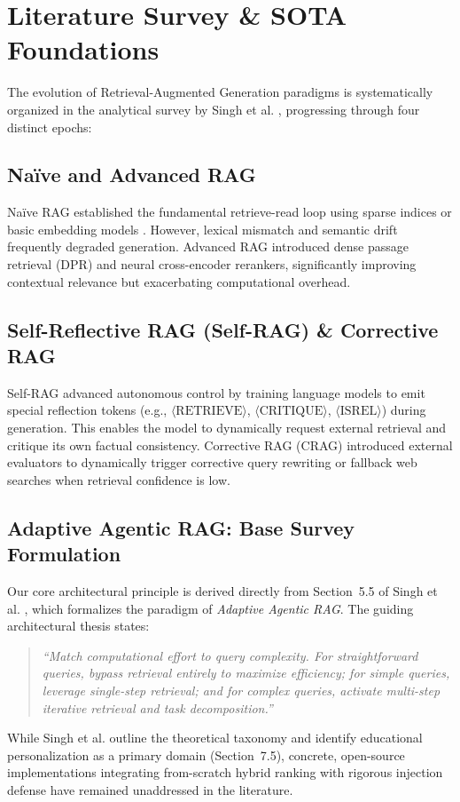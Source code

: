 \documentclass[conference]{IEEEtran}
\begin{document}
\section{Literature Survey \& SOTA Foundations}
The evolution of Retrieval-Augmented Generation paradigms is systematically organized in the analytical survey by Singh et al. \cite{singh2026agentic}, progressing through four distinct epochs:

\subsection{Na\"ive and Advanced RAG}
Na\"ive RAG established the fundamental retrieve-read loop using sparse indices or basic embedding models \cite{gao2024rag}. However, lexical mismatch and semantic drift frequently degraded generation. Advanced RAG introduced dense passage retrieval (DPR) \cite{karpukhin2020dpr} and neural cross-encoder rerankers, significantly improving contextual relevance but exacerbating computational overhead.

\subsection{Self-Reflective RAG (Self-RAG) \& Corrective RAG}
Self-RAG \cite{asai2024selfrag} advanced autonomous control by training language models to emit special reflection tokens (e.g., $\langle\text{RETRIEVE}\rangle$, $\langle\text{CRITIQUE}\rangle$, $\langle\text{ISREL}\rangle$) during generation. This enables the model to dynamically request external retrieval and critique its own factual consistency. Corrective RAG (CRAG) \cite{yan2024crag} introduced external evaluators to dynamically trigger corrective query rewriting or fallback web searches when retrieval confidence is low.

\subsection{Adaptive Agentic RAG: Base Survey Formulation}
Our core architectural principle is derived directly from Section~5.5 of Singh et al. \cite{singh2026agentic}, which formalizes the paradigm of \textit{Adaptive Agentic RAG}. The guiding architectural thesis states:
\begin{quote}
\textit{``Match computational effort to query complexity. For straightforward queries, bypass retrieval entirely to maximize efficiency; for simple queries, leverage single-step retrieval; and for complex queries, activate multi-step iterative retrieval and task decomposition.''} \cite{singh2026agentic}
\end{quote}
While Singh et al. outline the theoretical taxonomy and identify educational personalization as a primary domain (Section~7.5), concrete, open-source implementations integrating from-scratch hybrid ranking with rigorous injection defense have remained unaddressed in the literature.
\end{document}
